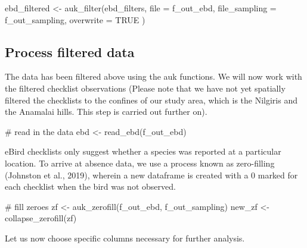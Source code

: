 \documentclass[]{article}
\newenvironment{Shaded}{}{}
\newcommand{\CommentTok}[1]{\textcolor[rgb]{0.00,0.50,0.00}{#1}}
\newcommand{\DataTypeTok}[1]{#1}
\newcommand{\KeywordTok}[1]{\textcolor[rgb]{0.00,0.00,1.00}{#1}}
\newcommand{\NormalTok}[1]{#1}
\newcommand{\OtherTok}[1]{\textcolor[rgb]{1.00,0.25,0.00}{#1}}
\newcommand{\StringTok}[1]{\textcolor[rgb]{0.00,0.50,0.50}{#1}}
\begin{document}
\begin{Shaded}
\begin{Highlighting}[numbers=left,,]
\NormalTok{ebd_filtered <-}\StringTok{ }\KeywordTok{auk_filter}\NormalTok{(ebd_filters,}
  \DataTypeTok{file =}\NormalTok{ f_out_ebd,}
  \DataTypeTok{file_sampling =}\NormalTok{ f_out_sampling, }\DataTypeTok{overwrite =} \OtherTok{TRUE}
\NormalTok{)}
\end{Highlighting}
\end{Shaded}

\hypertarget{process-filtered-data}{%
\subsection{Process filtered data}\label{process-filtered-data}}

The data has been filtered above using the auk functions. We will now work with the filtered checklist observations (Please note that we have not yet spatially filtered the checklists to the confines of our study area, which is the Nilgiris and the Anamalai hills. This step is carried out further on).

\begin{Shaded}
\begin{Highlighting}[numbers=left,,]
\CommentTok{# read in the data}
\NormalTok{ebd <-}\StringTok{ }\KeywordTok{read_ebd}\NormalTok{(f_out_ebd)}
\end{Highlighting}
\end{Shaded}

eBird checklists only suggest whether a species was reported at a particular location. To arrive at absence data, we use a process known as zero-filling (Johnston et al., 2019), wherein a new dataframe is created with a 0 marked for each checklist when the bird was not observed.

\begin{Shaded}
\begin{Highlighting}[numbers=left,,]
\CommentTok{# fill zeroes}
\NormalTok{zf <-}\StringTok{ }\KeywordTok{auk_zerofill}\NormalTok{(f_out_ebd, f_out_sampling)}
\NormalTok{new_zf <-}\StringTok{ }\KeywordTok{collapse_zerofill}\NormalTok{(zf) }
\end{Highlighting}
\end{Shaded}

Let us now choose specific columns necessary for further analysis.
\end{document}
